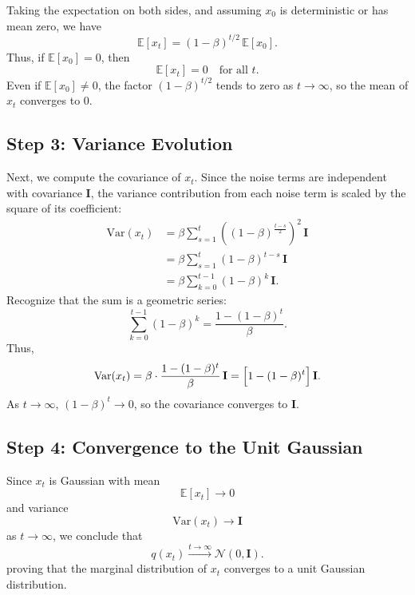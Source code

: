 \documentclass{article}
\begin{document}
Taking the expectation on both sides, and assuming $x_0$ is deterministic or has mean zero, we have
\[
\mathbb{E}[x_t] = (1-\beta)^{t/2} \, \mathbb{E}[x_0].
\]
Thus, if $\mathbb{E}[x_0] = 0$, then
\[
\mathbb{E}[x_t] = 0 \quad \text{for all } t.
\]
Even if $\mathbb{E}[x_0] \neq 0$, the factor $(1-\beta)^{t/2}$ tends to zero as $t \to \infty$, so the mean of $x_t$ converges to $0$.

\subsection*{Step 3: Variance Evolution}

Next, we compute the covariance of $x_t$. Since the noise terms are independent with covariance $\mathbf{I}$, the variance contribution from each noise term is scaled by the square of its coefficient:
\[
\begin{aligned}
\mathrm{Var}(x_t) &= \beta \sum_{s=1}^{t} \left((1-\beta)^{\frac{t-s}{2}}\right)^2 \, \mathbf{I}\\[1mm]
&= \beta \sum_{s=1}^{t} (1-\beta)^{t-s} \, \mathbf{I}\\[1mm]
&= \beta \sum_{k=0}^{t-1} (1-\beta)^k \, \mathbf{I}.
\end{aligned}
\]
Recognize that the sum is a geometric series:
\[
\sum_{k=0}^{t-1} (1-\beta)^k = \frac{1-(1-\beta)^t}{\beta}.
\]
Thus,
\[
\mathrm{Var}(x_t) = \beta \cdot \frac{1-(1-\beta)^t}{\beta} \, \mathbf{I} = \Bigl[1-(1-\beta)^t\Bigr] \, \mathbf{I}.
\]
As $t \to \infty$, $(1-\beta)^t \to 0$, so the covariance converges to $\mathbf{I}$.

\subsection*{Step 4: Convergence to the Unit Gaussian}

Since $x_t$ is Gaussian with mean
\[
\mathbb{E}[x_t] \to 0
\]
and variance
\[
\mathrm{Var}(x_t) \to \mathbf{I}
\]
as $t \to \infty$, we conclude that
\[
q(x_t) \xrightarrow{t\to\infty} \mathcal{N}(0, \mathbf{I}).
\]
proving that the marginal distribution of $x_t$ converges to a unit Gaussian distribution.
\end{document}
